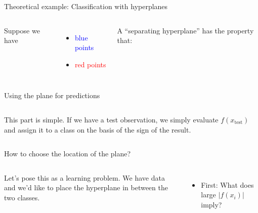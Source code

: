 \documentclass[mathserif, aspectratio=169]{beamer}
\begin{document}
\begin{frame}{Theoretical example: Classification with hyperplanes}
\begin{columns}
Suppose we have
\begin{itemize}
\item \textcolor{blue}{blue points}
\item \textcolor{red}{red points}
\end{itemize}
\vspace{10mm}
A ``separating hyperplane'' has the property that:


\end{columns}

\end{frame}

\begin{frame}{Using the plane for predictions}
\begin{columns}
This part is simple.  If we have a test observation, we simply evaluate $f(x_\text{test})$ and assign it to a class on the basis of the sign of the result.

\end{columns}
\end{frame}

\begin{frame}{How to choose the location of the plane?}
\begin{columns}
Let's pose this as a learning problem.  We have data and we'd like to place the hyperplane in between the two classes.

\begin{itemize}
\item First: What does  large $|f(x_i)|$ imply?  
\end{itemize}
\vspace{5mm}


\end{columns}
\end{frame}
\end{document}
